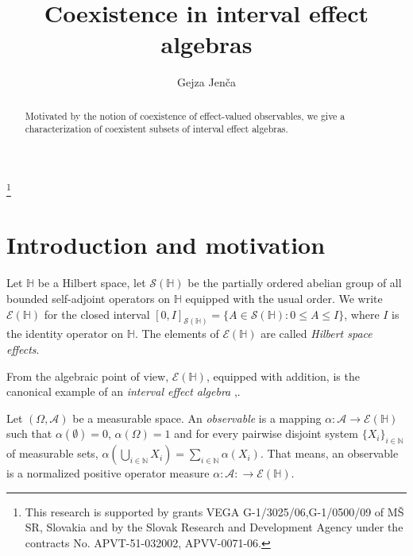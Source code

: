 \documentclass[letterpaper]{amsart}
\theoremstyle{definition}
\begin{document}
\title{Coexistence in interval effect algebras}
\author{Gejza Jen\v ca}
\address{
Department of Mathematics and Descriptive Geometry\\
Faculty of Civil Engineering\\
Radlinsk\' eho 11\\
	Bratislava 813 68\\
	Slovak Republic
}
\thanks{
This research is supported by grants VEGA G-1/3025/06,G-1/0500/09 of M\v S SR,
Slovakia and by the Slovak Research and Development Agency under the contracts
No. APVT-51-032002, APVV-0071-06.
}
\begin{abstract}
Motivated by the notion of coexistence of effect-valued observables,
we give a characterization of coexistent subsets of interval effect algebras.
\end{abstract}
\maketitle

\section{Introduction and motivation}

Let $\mathbb H$ be a Hilbert space, let $\mathcal S(\mathbb H)$ be the
partially ordered abelian group of all bounded self-adjoint operators on
$\mathbb H$ equipped with the usual order.  We write $\mathcal E(\mathbb H)$
for the closed interval $[0,I]_{\mathcal S(\mathbb H)}=\{A\in\mathcal S(\mathbb
H):0\leq A\leq I\}$, where $I$ is the identity operator on $\mathbb H$. 
The elements of $\mathcal E(\mathbb H)$ are called {\em Hilbert space effects}.

From the algebraic point of view, $\mathcal E(\mathbb H)$, equipped with addition,
is the canonical example of an {\em interval effect algebra} \cite{FouBen:EAaUQL},\cite{BenFou:IaSEA}.

Let $(\Omega,\mathcal A)$ be a measurable space.  An {\em observable} is a
mapping $\alpha:\mathcal A\to\mathcal E(\mathbb H)$ 
such that $\alpha(\emptyset)=0$, $\alpha(\Omega)=1$ and for every
pairwise disjoint system $\{X_i\}_{i\in\mathbb N}$ of measurable sets,
$\alpha(\bigcup_{i\in\mathbb N}X_i)=\sum_{i\in\mathbb N}\alpha(X_i)$.
That means, an observable is a normalized positive operator measure
$\alpha:\mathcal A:\to \mathcal E(\mathbb H)$.
\end{document}
